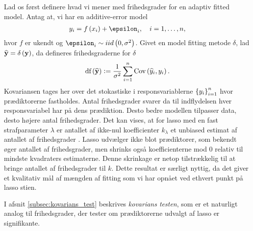 Lad os først definere hvad vi mener med frihedsgrader for en adaptiv fitted model. 
Antag at, vi har en additive-error model
\begin{align*}
y_i = f \del{x_i} + \epsilon_i, \quad i = 1, \ldots, n,
\end{align*}
hvor \(f\) er ukendt og \(\epsilon_i \sim iid \del{0, \sigma^2}\).
Givet en model fitting metode \(\delta\), lad \(\widehat{\y} = \delta \del{\y}\), da defineres frihedsgraderne for \(\delta\) 
\begin{align}
\text{df}\del{\widehat{\y}} := \frac{1}{\sigma^2} \sum_{i=1}^n \text{Cov}\del{\widehat{y}_i, y_i}. \label{eq:df_lasso}
\end{align}
Kovariansen tages her over det stokastiske i responsvariablerne \(\cbr{y_i}_{i=1}^n\) hvor prædiktorerne fastholdes.
Antal frihedsgrader svarer da til indflydelsen hver responsvariabel har på dens prædiktion.
Desto bedre modellen tilpasser data, desto højere antal frihedsgrader.
Det kan vises, at for lasso med en fast strafparameter \(\lambda\) er antallet af ikke-nul koefficienter \(k_\lambda\) et unbiased estimat af antallet af frihedsgrader \citep{df_lasso}.
%
Lasso udvælger ikke blot prædiktorer, som bekendt øger antallet af frihedsgrader, men shrinks også koefficienterne mod 0 relativ til mindste kvadraters estimaterne.
Denne skrinkage er netop tilstrækkelig til at bringe antallet af frihedsgrader til \(k\).
Dette resultat er særligt nyttig, da det giver et kvalitativ mål af mængden af fitting som vi har opnået ved ethvert punkt på lasso stien.

I afsnit \ref{subsec:kovarians_test} beskrives \textit{kovarians testen}, som er et naturligt analog til frihedsgrader, der tester om prædiktorerne udvalgt af lasso er signifikante.
